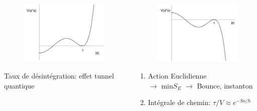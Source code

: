 \documentclass[handout]{beamer}
\begin{document}
\begin{frame}

\begin{columns}[T]
    \begin{column}[T]{.45\linewidth}
        \begin{figure}[.45\linewidth]
    \includegraphics[scale=0.2]{false1.png}
    \end{figure}
    Taux de désintégration: effet tunnel quantique

    \end{column}
    \begin{column}[T]{.45\linewidth}
   
     \begin{figure}
    \includegraphics[scale=0.15]{false2.png}
    \end{figure}
  \begin{enumerate}
    \item    Action Euclidienne\\
    $\rightarrow$ min$S_E$ $\rightarrow$ Bounce, instanton
    \item  Intégrale de chemin: $ \tau/V \approx e^{-So/\hbar}$ \\
   

\end{enumerate}
\end{column}
\end{columns}
\end{frame}
\end{document}

